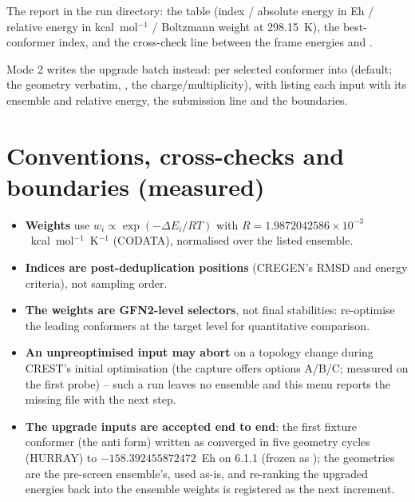 The report  in the run directory: the table
(index / absolute energy in Eh / relative energy in kcal~mol$^{-1}$ /
Boltzmann weight at 298.15~K), the best-conformer index, and the
cross-check line between the frame energies and .

Mode 2 writes the upgrade batch instead:  per
selected conformer into  (default; the geometry
verbatim, , the charge/multiplicity), with
 listing each input with its ensemble and
relative energy, the submission line and the boundaries.

\section{Conventions, cross-checks and boundaries (measured)}

\begin{readbox}
\begin{itemize}
  \item \textbf{Weights} use $w_i \propto \exp(-\Delta E_i / RT)$ with
    $R = 1.9872042586\times10^{-3}$~kcal~mol$^{-1}$~K$^{-1}$ (CODATA),
    normalised over the listed ensemble.
  \item \textbf{Indices are post-deduplication positions} (CREGEN's RMSD
    and energy criteria), not sampling order.
  \item \textbf{The weights are GFN2-level selectors}, not final
    stabilities: re-optimise the leading conformers at the target level
    for quantitative comparison.
  \item \textbf{An unpreoptimised input may abort} on a topology change
    during CREST's initial optimisation (the capture offers options
    A/B/C; measured on the first probe) -- such a run leaves no ensemble
    and this menu reports the missing file with the next step.
  \item \textbf{The upgrade inputs are accepted end to end}: the first
    fixture conformer (the anti form) written as 
    converged in five geometry cycles (HURRAY) to $-158.392455872472$~Eh
    on 6.1.1 (frozen as ); the geometries
    are the pre-screen ensemble's, used as-is, and re-ranking the
    upgraded energies back into the ensemble weights is registered as
    the next increment.
\end{itemize}
\end{readbox}
